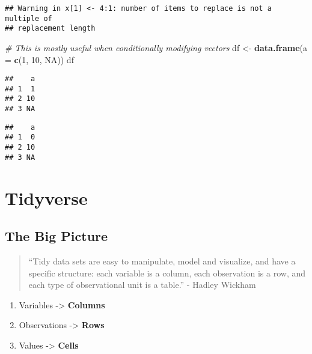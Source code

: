 \documentclass[
]{book}
\newenvironment{Shaded}{\begin{snugshade}}{\end{snugshade}}
\newcommand{\CommentTok}[1]{\textcolor[rgb]{0.56,0.35,0.01}{\textit{#1}}}
\newcommand{\DataTypeTok}[1]{\textcolor[rgb]{0.13,0.29,0.53}{#1}}
\newcommand{\DecValTok}[1]{\textcolor[rgb]{0.00,0.00,0.81}{#1}}
\newcommand{\KeywordTok}[1]{\textcolor[rgb]{0.13,0.29,0.53}{\textbf{#1}}}
\newcommand{\NormalTok}[1]{#1}
\newcommand{\OperatorTok}[1]{\textcolor[rgb]{0.81,0.36,0.00}{\textbf{#1}}}
\newcommand{\OtherTok}[1]{\textcolor[rgb]{0.56,0.35,0.01}{#1}}
\newcommand{\StringTok}[1]{\textcolor[rgb]{0.31,0.60,0.02}{#1}}
\providecommand{\tightlist}{%
  \setlength{\itemsep}{0pt}\setlength{\parskip}{0pt}}
\begin{document}
\begin{verbatim}
## Warning in x[1] <- 4:1: number of items to replace is not a multiple of
## replacement length
\end{verbatim}

\begin{Shaded}
\begin{Highlighting}[]
\CommentTok{\# This is mostly useful when conditionally modifying vectors}
\NormalTok{df \textless{}{-}}\StringTok{ }\KeywordTok{data.frame}\NormalTok{(}\DataTypeTok{a =} \KeywordTok{c}\NormalTok{(}\DecValTok{1}\NormalTok{, }\DecValTok{10}\NormalTok{, }\OtherTok{NA}\NormalTok{))}
\NormalTok{df}
\end{Highlighting}
\end{Shaded}

\begin{verbatim}
##    a
## 1  1
## 2 10
## 3 NA
\end{verbatim}

\begin{Shaded}
\end{Shaded}

\begin{verbatim}
##    a
## 1  0
## 2 10
## 3 NA
\end{verbatim}

\hypertarget{tidyverse}{%
\section{Tidyverse}\label{tidyverse}}

\hypertarget{the-big-picture-4}{%
\subsection{The Big Picture}\label{the-big-picture-4}}

\begin{quote}
``Tidy data sets are easy to manipulate, model and visualize, and have a specific structure: each variable is a column, each observation is a row, and each type of observational unit is a table.'' - Hadley Wickham
\end{quote}

\begin{enumerate}
\def\labelenumi{\arabic{enumi}.}
\tightlist
\item
  Variables -\textgreater{} \textbf{Columns}
\item
  Observations -\textgreater{} \textbf{Rows}
\item
  Values -\textgreater{} \textbf{Cells}
\end{enumerate}
\end{document}
